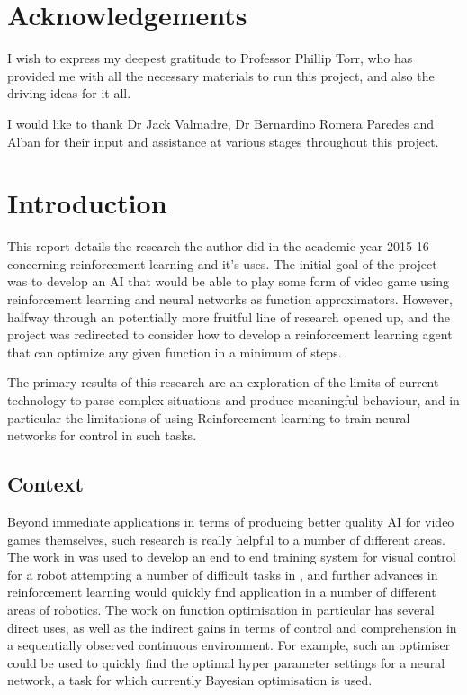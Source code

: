 \section{Acknowledgements}
I wish to express my deepest gratitude to Professor Phillip Torr, who has provided me with all the necessary materials to run this project, and also the driving ideas for it all.

I would like to thank Dr Jack Valmadre, Dr Bernardino Romera Paredes and Alban %
for their input and assistance at various stages throughout this project.
\section{Introduction}
This report details the research the author did in the academic year 2015-16 concerning reinforcement learning and it's uses. The initial goal of the project was to develop an AI that would be able to play some form of video game using reinforcement learning and neural networks as function approximators. However, halfway through an potentially more fruitful line of research opened up, and the project was redirected to consider how to develop a reinforcement learning agent that can optimize any given function in a minimum of steps.

The primary results of this research are an exploration of the limits of current technology to parse complex situations and produce meaningful behaviour, and in particular the limitations of using Reinforcement learning to train neural networks for control in such tasks.

\subsection{Context}
Beyond immediate applications in terms of producing better quality AI for video games themselves, such research is really helpful to a number of different areas. The work in \cite{atariDQN} was used to develop an end to end training system for visual control for a robot attempting a number of difficult tasks in \cite{levine2015end}, and further advances in reinforcement learning would quickly find application in a number of different areas of robotics. The work on function optimisation in particular has several direct uses, as well as the indirect gains in terms of control and comprehension in a sequentially observed continuous environment. For example, such an optimiser could be used to quickly find the optimal hyper parameter settings for  a neural network, a task for which currently Bayesian optimisation is used.

